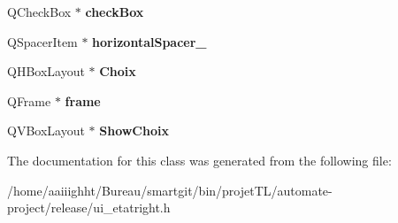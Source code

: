 \begin{DoxyCompactItemize}
\item 
\hypertarget{class_ui__etat_right_a2d1e013fd62a8b876b8041df17f5a8ca}{Q\-Check\-Box $\ast$ {\bfseries check\-Box}}\label{class_ui__etat_right_a2d1e013fd62a8b876b8041df17f5a8ca}

\item 
\hypertarget{class_ui__etat_right_aa961ba3779c675c3c2c6fd16ff92cf1f}{Q\-Spacer\-Item $\ast$ {\bfseries horizontal\-Spacer\-\_}}\label{class_ui__etat_right_aa961ba3779c675c3c2c6fd16ff92cf1f}

\item 
\hypertarget{class_ui__etat_right_a34d98550500db0387efb8badba4f3ec1}{Q\-H\-Box\-Layout $\ast$ {\bfseries Choix}}\label{class_ui__etat_right_a34d98550500db0387efb8badba4f3ec1}

\item 
\hypertarget{class_ui__etat_right_ac5c95d3db0afea496d4fc1a49e3f4815}{Q\-Frame $\ast$ {\bfseries frame}}\label{class_ui__etat_right_ac5c95d3db0afea496d4fc1a49e3f4815}

\item 
\hypertarget{class_ui__etat_right_acda9bfa42ade85b8c556ff9d31c95e0d}{Q\-V\-Box\-Layout $\ast$ {\bfseries Show\-Choix}}\label{class_ui__etat_right_acda9bfa42ade85b8c556ff9d31c95e0d}

\end{DoxyCompactItemize}


The documentation for this class was generated from the following file\-:\begin{DoxyCompactItemize}
\item 
/home/aaiiighht/\-Bureau/smartgit/bin/projet\-T\-L/automate-\/project/release/ui\-\_\-etatright.\-h\end{DoxyCompactItemize}
